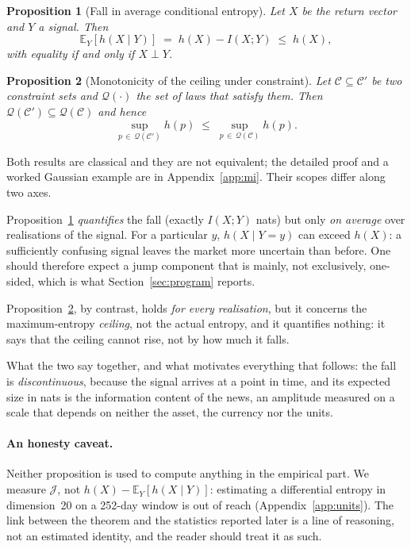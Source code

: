 \documentclass[11pt]{article}
\newtheorem{proposition}{Proposition}
\theoremstyle{definition}
\theoremstyle{remark}
\newcommand{\JJ}{\mathcal{J}}
\begin{document}
\begin{proposition}[Fall in average conditional entropy]
\label{prop:conditioning}
Let $X$ be the return vector and $Y$ a signal. Then
\begin{equation*}
\mathbb{E}_Y\!\left[h(X\mid Y)\right] \;=\; h(X) - I(X;Y) \;\le\; h(X),
\end{equation*}
with equality if and only if $X\perp Y$.
\end{proposition}

\begin{proposition}[Monotonicity of the ceiling under constraint]
\label{prop:constraint}
Let $\mathcal{C}\subseteq\mathcal{C}'$ be two constraint sets and
$\mathcal{Q}(\cdot)$ the set of laws that satisfy them. Then
$\mathcal{Q}(\mathcal{C}')\subseteq\mathcal{Q}(\mathcal{C})$ and hence
\begin{equation*}
\sup_{p\,\in\,\mathcal{Q}(\mathcal{C}')} h(p) \;\le\; \sup_{p\,\in\,\mathcal{Q}(\mathcal{C})} h(p).
\end{equation*}
\end{proposition}

Both results are classical \citep{cover2006} and they are not equivalent; the
detailed proof and a worked Gaussian example are in Appendix~\ref{app:mi}. Their
scopes differ along two axes.

Proposition~\ref{prop:conditioning} \emph{quantifies} the fall (exactly
$I(X;Y)$ nats) but only \emph{on average} over realisations of the signal. For a
particular $y$, $h(X\mid Y=y)$ can exceed $h(X)$: a sufficiently confusing signal
leaves the market more uncertain than before. One should therefore expect a jump
component that is mainly, not exclusively, one-sided, which is what
Section~\ref{sec:program} reports.

Proposition~\ref{prop:constraint}, by contrast, holds \emph{for every
realisation}, but it concerns the maximum-entropy \emph{ceiling}, not the actual
entropy, and it quantifies nothing: it says that the ceiling cannot rise, not by
how much it falls.

What the two say together, and what motivates everything that follows: the fall
is \emph{discontinuous}, because the signal arrives at a point in time, and its
expected size in nats is the information content of the news, an amplitude
measured on a scale that depends on neither the asset, the currency nor the
units.

\paragraph{An honesty caveat.} Neither proposition is used to compute anything in
the empirical part. We measure $\JJ$, not $h(X)-\mathbb{E}_Y[h(X\mid Y)]$:
estimating a differential entropy in dimension~20 on a 252-day window is out of
reach (Appendix~\ref{app:units}). The link between the theorem and the
statistics reported later is a line of reasoning, not an estimated identity, and
the reader should treat it as such.
\end{document}
